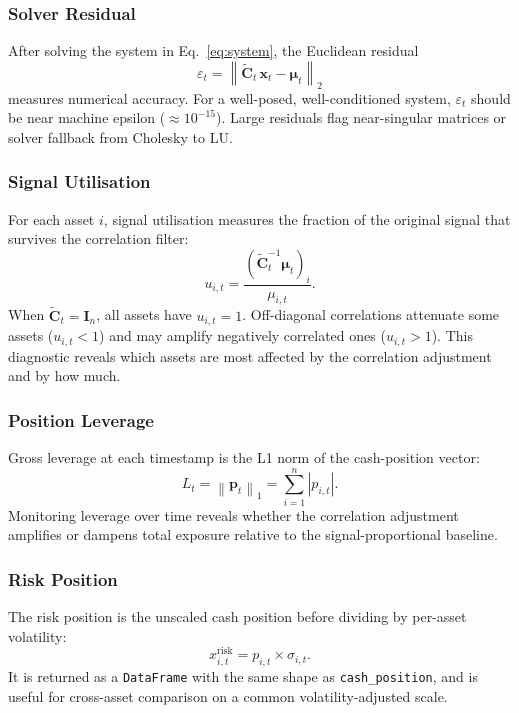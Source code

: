 \documentclass[11pt,a4paper]{article}
\newcommand{\C}{\mathbf{C}}
\newcommand{\I}{\mathbf{I}}
\newcommand{\x}{\mathbf{x}}
\newcommand{\muvec}{\bm{\mu}}
\newcommand{\norm}[1]{\left\|#1\right\|}
\newcommand{\abs}[1]{\left|#1\right|}
\begin{document}
\subsubsection{Solver Residual}

After solving the system in Eq.~\eqref{eq:system}, the Euclidean residual
\begin{equation}
  \varepsilon_t = \norm{\tilde{\C}_t\,\x_t - \muvec_t}_2
\end{equation}
measures numerical accuracy.  For a well-posed, well-conditioned system,
$\varepsilon_t$ should be near machine epsilon ($\approx 10^{-15}$).  Large
residuals flag near-singular matrices or solver fallback from Cholesky to LU.

\subsubsection{Signal Utilisation}

For each asset $i$, signal utilisation measures the fraction of the original
signal that survives the correlation filter:
\begin{equation}
  u_{i,t} = \frac{(\tilde{\C}_t^{-1}\muvec_t)_i}{\mu_{i,t}}.
\end{equation}
When $\tilde{\C}_t = \I_n$, all assets have $u_{i,t} = 1$.  Off-diagonal
correlations attenuate some assets ($u_{i,t} < 1$) and may amplify
negatively correlated ones ($u_{i,t} > 1$).  This diagnostic reveals
which assets are most affected by the correlation adjustment and by how much.

\subsubsection{Position Leverage}

Gross leverage at each timestamp is the L1 norm of the cash-position vector:
\begin{equation}
  L_t = \norm{\mathbf{p}_t}_1 = \sum_{i=1}^{n} \abs{p_{i,t}}.
\end{equation}
Monitoring leverage over time reveals whether the correlation adjustment
amplifies or dampens total exposure relative to the signal-proportional
baseline.

\subsubsection{Risk Position}

The risk position is the unscaled cash position before dividing by
per-asset volatility:
\begin{equation}
  x_{i,t}^\text{risk} = p_{i,t} \times \sigma_{i,t}.
\end{equation}
It is returned as a \texttt{DataFrame} with the same shape as
\texttt{cash\_position}, and is useful for cross-asset comparison on a
common volatility-adjusted scale.
\end{document}
